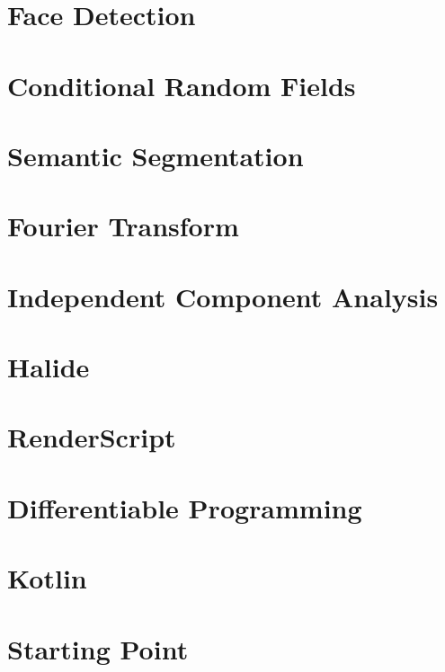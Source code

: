 \section{Face Detection}
\section{Conditional Random Fields}
\section{Semantic Segmentation}
\section{Fourier Transform}
\section{Independent Component Analysis}
\section{Halide}
\section{RenderScript}
\section{Differentiable Programming}
\section{Kotlin}
\section{Starting Point}